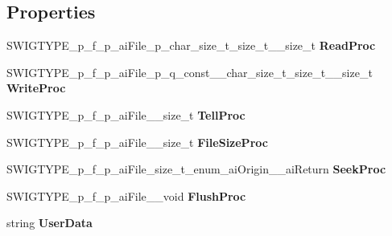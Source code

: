 \subsection*{Properties}
\begin{DoxyCompactItemize}
\item 
\hypertarget{structai_file_adcf15336819116d8307d9efa3d9fb60e}{S\+W\+I\+G\+T\+Y\+P\+E\+\_\+p\+\_\+f\+\_\+p\+\_\+ai\+File\+\_\+p\+\_\+char\+\_\+size\+\_\+t\+\_\+size\+\_\+t\+\_\+\+\_\+size\+\_\+t {\bfseries Read\+Proc}}\label{structai_file_adcf15336819116d8307d9efa3d9fb60e}

\item 
\hypertarget{structai_file_a3e0a407ed91b35ed55ecc0392a5f4a31}{S\+W\+I\+G\+T\+Y\+P\+E\+\_\+p\+\_\+f\+\_\+p\+\_\+ai\+File\+\_\+p\+\_\+q\+\_\+const\+\_\+\+\_\+char\+\_\+size\+\_\+t\+\_\+size\+\_\+t\+\_\+\+\_\+size\+\_\+t {\bfseries Write\+Proc}}\label{structai_file_a3e0a407ed91b35ed55ecc0392a5f4a31}

\item 
\hypertarget{structai_file_a20a2e6189b181bc01e5aa0bd28190526}{S\+W\+I\+G\+T\+Y\+P\+E\+\_\+p\+\_\+f\+\_\+p\+\_\+ai\+File\+\_\+\+\_\+size\+\_\+t {\bfseries Tell\+Proc}}\label{structai_file_a20a2e6189b181bc01e5aa0bd28190526}

\item 
\hypertarget{structai_file_a30e861db9fef1b7d00f81f85857232dc}{S\+W\+I\+G\+T\+Y\+P\+E\+\_\+p\+\_\+f\+\_\+p\+\_\+ai\+File\+\_\+\+\_\+size\+\_\+t {\bfseries File\+Size\+Proc}}\label{structai_file_a30e861db9fef1b7d00f81f85857232dc}

\item 
\hypertarget{structai_file_ac8c96d77e2949fc8327fd0f92caefd92}{S\+W\+I\+G\+T\+Y\+P\+E\+\_\+p\+\_\+f\+\_\+p\+\_\+ai\+File\+\_\+size\+\_\+t\+\_\+enum\+\_\+ai\+Origin\+\_\+\+\_\+ai\+Return {\bfseries Seek\+Proc}}\label{structai_file_ac8c96d77e2949fc8327fd0f92caefd92}

\item 
\hypertarget{structai_file_a4df2cedab7668153a6335edf4bd9cff9}{S\+W\+I\+G\+T\+Y\+P\+E\+\_\+p\+\_\+f\+\_\+p\+\_\+ai\+File\+\_\+\+\_\+void {\bfseries Flush\+Proc}}\label{structai_file_a4df2cedab7668153a6335edf4bd9cff9}

\item 
\hypertarget{structai_file_a7554d6d8e679375f640b3cc3d3a21fe4}{string {\bfseries User\+Data}}\label{structai_file_a7554d6d8e679375f640b3cc3d3a21fe4}

\end{DoxyCompactItemize}


